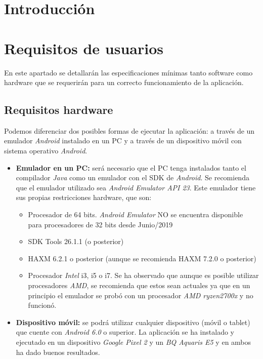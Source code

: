 
\section{Introducción}

\section{Requisitos de usuarios}
En este apartado se detallarán las especificaciones mínimas tanto software como hardware que se requerirán para un correcto funcionamiento de la aplicación.
\subsection{Requisitos hardware}
Podemos diferenciar dos posibles formas de ejecutar la aplicación: a través de un emulador \textit{Android} instalado en un PC y a través de un dispositivo móvil con sistema operativo \textit{Android}.
\begin{itemize}
\item \textbf{Emulador en un PC:} será necesario que el PC tenga instalados tanto el compilador \textit{Java} como un emulador  con el SDK de \textit{Android}.
Se recomienda que el emulador utilizado sea \textit{Android Emulator API 23}.
Este emulador tiene sus propias restricciones hardware, que son:
\begin{itemize}
\item Procesador de 64 bits. \textit{Android Emulator} NO se encuentra disponible para procesadores de 32 bits desde Junio/2019
\item SDK Tools 26.1.1 (o posterior)
\item HAXM 6.2.1 o posterior (aunque se recomienda HAXM 7.2.0 o posterior)
\item Procesador \textit{Intel} i3, i5 o i7. Se ha observado que aunque es posible utilizar procesadores \textit{AMD}, se recomienda que estos sean actuales ya que en un principio el emulador se probó con un procesador \textit{AMD ryzen2700x} y no funcionó.
\end{itemize}
\item \textbf{Dispositivo móvil:} se podrá utilizar cualquier dispositivo (móvil o tablet) que cuente con \textit{Android 6.0} o superior. La aplicación se ha instalado y ejecutado en un dispositivo \textit{Google Pixel 2} y un \textit{BQ Aquaris E5} y en ambos ha dado buenos resultados.
\end{itemize}
